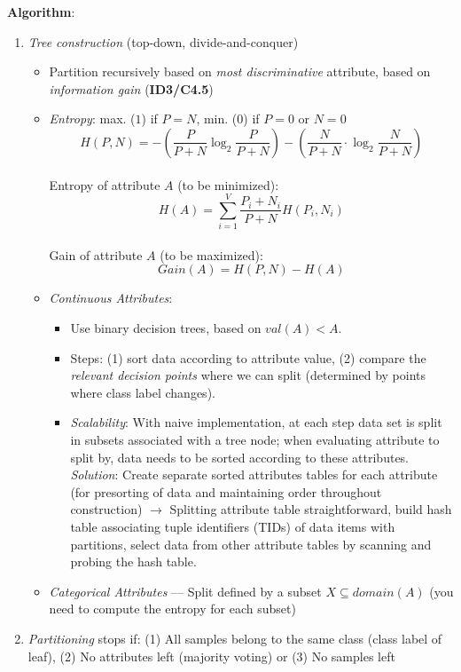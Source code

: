     \textbf{Algorithm}:
    \begin{enumerate}
      \item \emph{Tree construction} (top-down, divide-and-conquer)
      \begin{itemize}
        \item Partition recursively based on \emph{most discriminative} attribute, based on \emph{information gain} (\textbf{ID3/C4.5})
        \item \emph{Entropy}: max. ($1$) if $P=N$, min. ($0$) if $P=0$ or $N=0$
        $$H(P,N)=-(\frac{P}{P+N}\log_2{\frac{P}{P+N}})-(\frac{N}{P+N}\cdot\log_2{\frac{N}{P+N}})$$\\
        Entropy of attribute $A$ (to be minimized):
        $$H(A)=\sum_{i=1}^V\frac{P_i+N_i}{P+N}H(P_i,N_i)$$\\
        Gain of attribute $A$ (to be maximized):
        $$Gain(A)=H(P,N)-H(A)$$
        \item \emph{Continuous Attributes}:
        \begin{itemize}
          \item Use binary decision trees, based on $val(A)<A$.
          \item Steps: (1) sort data according to attribute value, (2) compare the \emph{relevant decision points} where we can split (determined by points where class label changes).
          \item \emph{Scalability}: With naive implementation, at each step data set is split in subsets associated with a tree node; when evaluating attribute to split by, data needs to be sorted according to these attributes.\\
          \emph{Solution}: Create separate sorted attributes tables for each attribute (for presorting of data and maintaining order throughout construction) $\rightarrow$ Splitting attribute table straightforward, build hash table associating tuple identifiers (TIDs) of data items with partitions, select data from other attribute tables by scanning and probing the hash table.
        \end{itemize}
        \item \emph{Categorical Attributes} --- Split defined by a subset $X\subseteq domain(A)$ (you need to compute the entropy for each subset)
      \end{itemize}
      \item \emph{Partitioning} stops if: (1) All samples belong to the same class (class label of leaf), (2) No attributes left (majority voting) or (3) No samples left

\end{enumerate}
